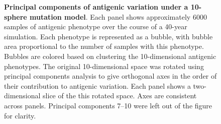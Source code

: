 \documentclass[11pt,oneside,letterpaper]{article}
\begin{document}
\pagebreak

\begin{figure}[c]
	\centering
	\caption{\textbf{Principal components of antigenic variation under a 10-sphere mutation model}. Each panel shows approximately 6000 samples of antigenic phenotype over the course of a 40-year simulation.  Each phenotype is represented as a bubble, with bubble area proportional to the number of samples with this phenotype.  Bubbles are colored based on clustering the 10-dimensional antigenic phenotypes.  The original 10-dimensional space was rotated using principal components analysis to give orthogonal axes in the order of their contribution to antigenic variation.  Each panel shows a two-dimensional slice of the this rotated space.  Axes are consistent across panels.  Principal components 7--10 were left out of the figure for clarity.}
	\label{10dgrid}
\end{figure}

\pagebreak
\end{document}
